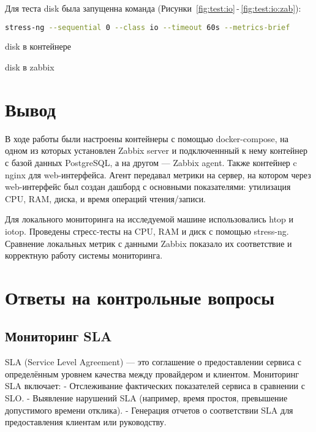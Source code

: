 Для теста disk была запущенна команда
(Рисунки~\ref{fig:test:io}\,-\,\ref{fig:test:io:zab}):
\begin{lstlisting}[language=bash]
stress-ng --sequential 0 --class io --timeout 60s --metrics-brief
\end{lstlisting}

\begin{image}
    \caption{disk в контейнере}
    \label{fig:test:io}
\end{image}

\begin{image}
    \caption{disk в zabbix}
    \label{fig:test:io:zab}
\end{image}

\clearpage

\section*{\LARGE Вывод}
В ходе работы были настроены контейнеры с помощью docker-compose,
на одном из которых установлен Zabbix server
и подключеннный к нему контейнер с базой данных PostgreSQL,
а на другом --- Zabbix agent. Также контейнер c nginx для web-интерфейса.
Агент передавал метрики на сервер,
на котором через web-интерфейс был создан дашборд с основными показателями:
утилизация CPU, RAM, диска, и время операций чтения/записи.\par
Для локального мониторинга на исследуемой машине использовались htop и iotop.
Проведены стресс-тесты на CPU, RAM и диск с помощью stress-ng.
Сравнение локальных метрик с данными Zabbix показало их соответствие
и корректную работу системы мониторинга.

\clearpage

\section{Ответы на контрольные вопросы}
\subsection{Мониторинг SLA}
SLA (Service Level Agreement) — это соглашение о предоставлении сервиса с определённым уровнем качества между провайдером и клиентом. Мониторинг SLA включает:
- Отслеживание фактических показателей сервиса в сравнении с SLO.
- Выявление нарушений SLA (например, время простоя, превышение допустимого времени отклика).
- Генерация отчетов о соответствии SLA для предоставления клиентам или руководству.

